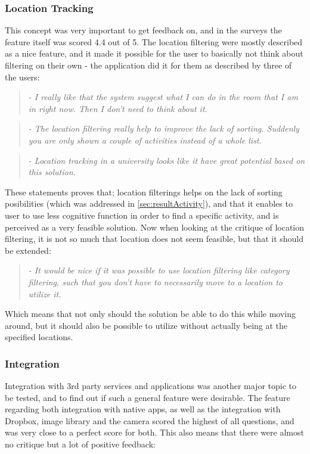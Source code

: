 \subsubsection{Location Tracking}
This concept was very important to get feedback on, and in the surveys the feature itself was scored 4.4 out of 5. The location filtering were mostly described as a nice feature, and it made it possible for the user to basically not think about filtering on their own - the application did it for them as described by three of the users:

\begin{quotation}
	\emph{
		- I really like that the system suggest what I can do in the room that I am in right now. Then I don't need to think about it.
	}
\end{quotation}

\begin{quotation}
	\emph{
		- The location filtering really help to improve the lack of sorting. Suddenly you are only shown a couple of activities instead of a whole list.
	}
\end{quotation}

\begin{quotation}
	\emph{
		- Location tracking in a university looks like it have great potential based on this solution.
	}
\end{quotation}

These statements proves that; location filterings helps on the lack of sorting posibilities (which was addressed in \ref{sec:resultActivity}), and that it enables to user to use less cognitive function in order to find a specific activity, and is perceived as a very feasible solution. Now when looking at the critique of location filtering, it is not so much that location does not seem feasible, but that it should be extended:

\begin{quotation}
	\emph{
		- It would be nice if it was possible to use location filtering like category filtering, such that you don't have to necessarily move to a location to utilize it.
	}
\end{quotation}

Which means that not only should the solution be able to do this while moving around, but it should also be possible to utilize without actually being at the specified locations.

\subsubsection{Integration}
Integration with 3rd party services and applications was another major topic to be tested, and to find out if such a general feature were desirable. The feature regarding both integration with native apps, as well as the integration with Dropbox, image library and the camera scored the highest of all questions, and was very close to a perfect score for both. This also means that there were almost no critique but a lot of positive feedback:

